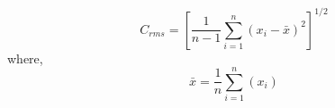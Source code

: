 \documentclass[../main.tex]{subfiles}%
\begin{document}
%
    \Xequation%
    \begin{equation}%
        C_{rms} =%
        \left[%
            \dfrac{1}{n-1}%
            \sum^{n}_{i=1}%
            (x_{i} - \bar{x})^{2}%
        \right]^{1/2}%
        \label{eq:contrast-rms}%
    \end{equation}%
    where,%
    \begin{equation*}%
        \bar{x} =%
        \dfrac{1}{n}\sum^{n}_{i=1}(x_{i})%
    \end{equation*}%
\end{document}
